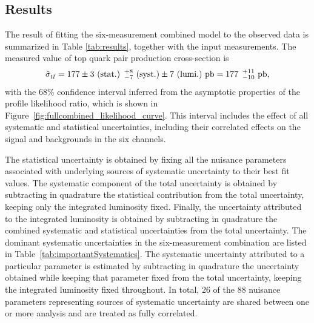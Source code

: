 

\subsection{Results}
\label{sec:results}

The result of fitting the six-measurement combined model to the observed data is summarized in Table \ref{tab:results}, 
together with the input measurements.
The measured value of top quark pair production cross-section is
\begin{equation}
\hat\sigma_{t\bar{t}} =  177 \pm 3~\textrm{(stat.)} \hspace{ 5 pt } {}^{+8}_{-7}~\textrm{(syst.)} \pm 7~\textrm{(lumi.)}~\textrm{pb} = 177 \hspace{ 5 pt } {}^{+11}_{-10}~\textrm{pb}, \nonumber
\end{equation}
with the 68\% confidence interval inferred from the asymptotic properties of the profile likelihood ratio, which is shown in Figure~\ref{fig:fullcombined_likelihood_curve}.  
This interval includes the effect of all systematic and statistical uncertainties, including their correlated effects on the signal and backgrounds in the six channels.  

The statistical uncertainty is obtained by fixing all the nuisance parameters associated with underlying sources of systematic uncertainty to their best fit values.  
The systematic component of the total uncertainty is obtained by subtracting in quadrature the statistical contribution from the total uncertainty, keeping only the integrated luminosity fixed.
Finally, the uncertainty attributed to the integrated luminosity is obtained by subtracting in quadrature the combined systematic and statistical uncertainties from the total uncertainty.
The dominant systematic uncertainties in the six-measurement combination are listed in Table~\ref{tab:importantSystematics}. 
The systematic uncertainty attributed to a particular parameter is estimated by subtracting in quadrature the uncertainty obtained
while keeping that parameter fixed from the total uncertainty, keeping the integrated luminosity fixed throughout.
In total, 26 of the 88 nuisance parameters representing sources of systematic uncertainty are shared between one or more analysis and are treated as fully correlated.

